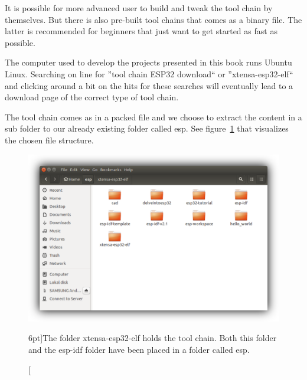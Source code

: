 \documentclass{tufte-book}
\begin{document}
It is possible for more advanced user to build and tweak the tool chain by themselves. But there is also pre-built tool chains that comes as a binary file. The latter is recommended for beginners that just want to get started as fast as possible.


The computer used to develop the projects presented in this book runs Ubuntu Linux. Searching on line for ''tool chain ESP32 download`` or ''xtensa-esp32-elf`` and clicking around a bit on the hits for these searches will eventually lead to a download page of the correct type of tool chain.

The tool chain comes as in a packed file and we choose to extract the content in a sub folder to our already existing folder called esp. See figure~\ref{fig:tool_chain_folder_shadowed} that visualizes the chosen file structure.

\begin{figure}
	\includegraphics{tool_chain_folder_shadowed.png}
	\caption[ $n$.][6pt]{The folder xtensa-esp32-elf holds the tool chain. Both this folder and the esp-idf folder have been placed in a folder called esp.}
	\label{fig:tool_chain_folder_shadowed}
\end{figure}
\end{document}
